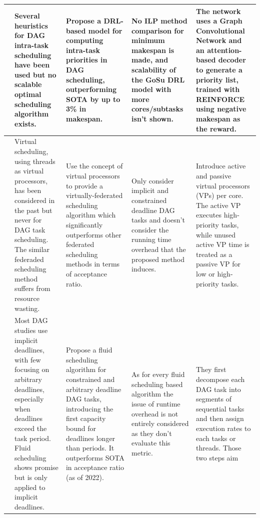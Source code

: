 \begin{table}
    \centering
    \begin{tabular}[]{|p{0.15in}|p{1.6in}|p{1.6in}|p{1.6in}|p{1.6in}|}
        \hline
        \cite{Lee2021GlobalDagSchedDRL} & Several heuristics for DAG intra-task scheduling
        have been used but no scalable optimal scheduling algorithm exists. &
        Propose a DRL-based model for computing intra-task priorities in DAG scheduling, 
        outperforming SOTA by up to 3\% in makespan. & No ILP method comparison for minimum makespan
        is made, and scalability of the GoSu DRL model with more cores/subtasks isn't shown. & The network uses a Graph Convolutional Network 
        and an attention-based decoder to generate a priority list, 
        trained with REINFORCE using negative makespan as the reward.  \\
        \hline
        \cite{Jiang2023SchedVirtualProcs} & 
        Virtual scheduling, using threads as virtual processors, 
        has been considered in the past but never for DAG task scheduling.
        The similar federaded scheduling method 
        suffers from resource wasting. & Use the concept of virtual processors
        to provide a virtually-federated scheduling algorithm
        which significantly outperforms other federated scheduling methods
        in terms of acceptance ratio. & Only consider implicit and constrained deadline DAG tasks
        and doesn't consider the running time overhead that the proposed method induces. 
        & Introduce active and passive virtual processors (VPs) per core. The active VP executes high-priority tasks, 
        while unused active VP time is treated as a passive VP for low or high-priority tasks.\\
        \hline
        \cite{GuanFluidDag2022} & Most DAG studies use implicit deadlines, 
        with few focusing on arbitrary deadlines, especially when deadlines exceed the task period. Fluid scheduling
         shows promise but is only applied to implicit deadlines. & Propose a fluid scheduling algorithm for constrained and arbitrary deadline DAG tasks, 
         introducing the first capacity bound for deadlines longer than periods. It outperforms SOTA in acceptance ratio (as of 2022). & As for every fluid scheduling based algorithm
        the issue of runtime overhead is not 
        entirely considered as they don't evaluate this metric. & They first decompose each DAG task
        into segments of sequential tasks and then assign execution rates
        to each tasks or threads. Those two steps aim 

\end{tabular}
\end{table}
